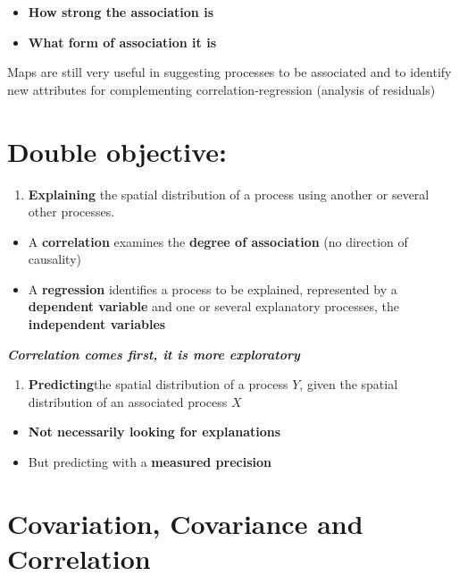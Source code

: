 \documentclass[
  letterpaper,
  DIV=11,
  numbers=noendperiod]{scrreprt}
\providecommand{\tightlist}{%
  \setlength{\itemsep}{0pt}\setlength{\parskip}{0pt}}\usepackage{longtable,booktabs,array}
\begin{document}
\begin{itemize}
\tightlist
\item
  \textbf{How strong the association is}
\item
  \textbf{What form of association it is}
\end{itemize}

Maps are still very useful in suggesting processes to be associated and
to identify new attributes for complementing correlation-regression
(analysis of residuals)

\section{Double objective:}\label{double-objective}

\begin{enumerate}
\def\labelenumi{\arabic{enumi}.}
\tightlist
\item
  \textbf{Explaining} the spatial distribution of a process using
  another or several other processes.
\end{enumerate}

\begin{itemize}
\tightlist
\item
  A \textbf{correlation} examines the \textbf{degree of association} (no
  direction of causality)
\item
  A \textbf{regression} identifies a process to be explained,
  represented by a \textbf{dependent variable} and one or several
  explanatory processes, the \textbf{independent variables}
\end{itemize}

\textbf{\emph{Correlation comes first, it is more exploratory}}

\begin{enumerate}
\def\labelenumi{\arabic{enumi}.}
\setcounter{enumi}{1}
\tightlist
\item
  \textbf{Predicting}the spatial distribution of a process \(Y\), given
  the spatial distribution of an associated process \(X\)
\end{enumerate}

\begin{itemize}
\tightlist
\item
  \textbf{Not necessarily looking for explanations}
\item
  But predicting with a \textbf{measured precision}
\end{itemize}

\section{Covariation, Covariance and
Correlation}\label{covariation-covariance-and-correlation}
\end{document}
